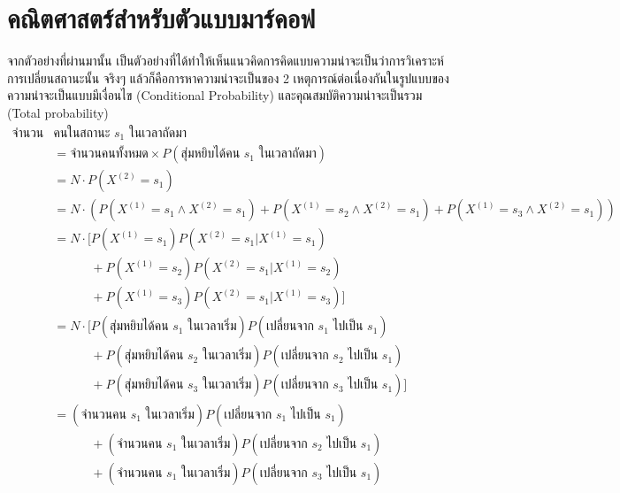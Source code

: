 \section{คณิตศาสตร์สำหรับตัวแบบมาร์คอฟ}
จากตัวอย่างที่ผ่านมานั้น เป็นตัวอย่างที่ได้ทำให้เห็นแนวคิดการคิดแบบความน่าจะเป็นว่าการวิเคราะห์การเปลี่ยนสถานะนั้น จริงๆ แล้วก็คือการหาความน่าจะเป็นของ 2 เหตุการณ์ต่อเนื่องกันในรูปแบบของความน่าจะเป็นแบบมีเงื่อนไข (Conditional Probability) และคุณสมบัติความน่าจะเป็นรวม (Total probability)
\begin{align*}
    \text{จำนวน}&\text{คนในสถานะ $s_1$ ในเวลาถัดมา}\\ 
            &= \text{จำนวนคนทั้งหมด}\times P(\text{สุ่มหยิบได้คน $s_1$ ในเวลาถัดมา})\\
            &= N \cdot P(X^{(2)} = s_1)\\
            &= N\cdot\left(P(X^{(1)} = s_1 \wedge X^{(2)} = s_1) + P(X^{(1)} = s_2 \wedge X^{(2)} = s_1) + P(X^{(1)} = s_3 \wedge X^{(2)} = s_1)  \right)\\
            &= N\cdot\bigl[ P(X^{(1)} = s_1)P(X^{(2)} = s_1 | X^{(1)} = s_1) \\
            &\qquad\quad+ P(X^{(1)} = s_2)P(X^{(2)} = s_1 | X^{(1)} = s_2)\\
            &\qquad\quad+ P(X^{(1)} = s_3)P(X^{(2)} = s_1 | X^{(1)} = s_3) \bigr]\\
            &= N\cdot\bigl[ P(\text{สุ่มหยิบได้คน $s_1$ ในเวลาเริ่ม})P(\text{เปลี่ยนจาก $s_1$ ไปเป็น $s_1$}) \\
            &\qquad\quad+ P(\text{สุ่มหยิบได้คน $s_2$ ในเวลาเริ่ม})P(\text{เปลี่ยนจาก $s_2$ ไปเป็น $s_1$})\\
            &\qquad\quad+ P(\text{สุ่มหยิบได้คน $s_3$ ในเวลาเริ่ม})P(\text{เปลี่ยนจาก $s_3$ ไปเป็น $s_1$}) \bigr]\\
            &= (\text{จำนวนคน $s_1$ ในเวลาเริ่ม})P(\text{เปลี่ยนจาก $s_1$ ไปเป็น $s_1$}) \\
            &\qquad\quad+ (\text{จำนวนคน $s_1$ ในเวลาเริ่ม})P(\text{เปลี่ยนจาก $s_2$ ไปเป็น $s_1$})\\
            &\qquad\quad+ (\text{จำนวนคน $s_1$ ในเวลาเริ่ม})P(\text{เปลี่ยนจาก $s_3$ ไปเป็น $s_1$})
\end{align*}

